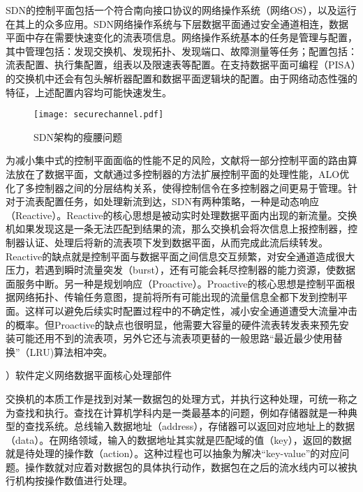 SDN的控制平面包括一个符合南向接口协议的网络操作系统（网络OS），以及运行在其上的众多应用。SDN网络操作系统与下层数据平面通过安全通道相连，数据平面中存在需要快速变化的流表项信息。网络操作系统基本的任务是管理与配置，其中管理包括：发现交换机、发现拓扑、发现端口、故障测量等任务；配置包括：流表配置、执行集配置，组表以及限速表等配置。在支持数据平面可编程（PISA）的交换机中还会有包头解析器配置和数据平面逻辑块的配置。由于网络动态性强的特征，上述配置内容均可能快速发生。

\begin{figure}[!ht]
	\centering 
	\vspace{-1.5mm}
	\texttt{[image: securechannel.pdf]}
	\caption{SDN架构的瘦腰问题} \label{fig:securechannel}
\end{figure}


为减小集中式的控制平面面临的性能不足的风险，文献\cite{curtis2011devoflow,openflowhibd,yu2010scalable}将一部分控制平面的路由算法放在了数据平面，文献\cite{yazici2014controlling,openflow12}通过多控制器的方法扩展控制平面的处理性能，ALO\cite{alo2012}优化了多控制器之间的分层结构关系，使得控制信令在多控制器之间更易于管理。针对于流表配置任务，如处理新流到达，SDN有两种策略，一种是动态响应（Reactive）。Reactive的核心思想是被动实时处理数据平面内出现的新流量。交换机如果发现这是一条无法匹配到结果的流，那么交换机会将次信息上报控制器，控制器认证、处理后将新的流表项下发到数据平面，从而完成此流后续转发。Reactive的缺点就是控制平面与数据平面之间信息交互频繁，对安全通道造成很大压力，若遇到瞬时流量突发（burst），还有可能会耗尽控制器的能力资源，使数据面服务中断。另一种是规划响应（Proactive）。Proactive的核心思想是控制平面根据网络拓扑、传输任务意图，提前将所有可能出现的流量信息全都下发到控制平面。这样可以避免后续实时配置过程中的不确定性，减小安全通道遭受大流量冲击的概率。但Proactive的缺点也很明显，他需要大容量的硬件流表转发表来预先安装可能还用不到的流表项，另外它还与流表项更替的一般思路“最近最少使用替换”（LRU)算法相冲突。









{）软件定义网络数据平面核心处理部件}


交换机的本质工作是找到对某一数据包的处理方式，并执行这种处理，可统一称之为查找和执行。查找在计算机学科内是一类最基本的问题，例如存储器就是一种典型的查找系统。总线输入数据地址（address），存储器可以返回对应地址上的数据（data）。在网络领域，输入的数据地址其实就是匹配域的值（key），返回的数据就是待处理的操作数（action）。这种过程也可以抽象为解决“key-value”的对应问题。操作数就对应着对数据包的具体执行动作，数据包在之后的流水线内可以被执行机构按操作数值进行处理。


